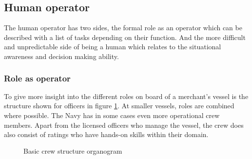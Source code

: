\subsection{Human operator}
The human operator has two sides, the formal role as an operator which can be described with a list of tasks depending on their function. And the more difficult and unpredictable side of being a human which relates to the situational awareness and decision making ability.

\subsubsection{Role as operator}
\label{sec:deck-crew}
To give more insight into the different roles on board of a merchant's vessel is the structure shown for officers in figure \ref{fig:crew-structure}. At smaller vessels, roles are combined where possible. The Navy has in some cases even more operational crew members. Apart from the licensed officers who manage the vessel, the crew does also consist of ratings who have hands-on skills within their domain. \cite{Nedcon2013}


\begin{figure}[p]
	\centering
	\caption{Basic crew structure organogram}
	\label{fig:crew-structure}
\end{figure}

